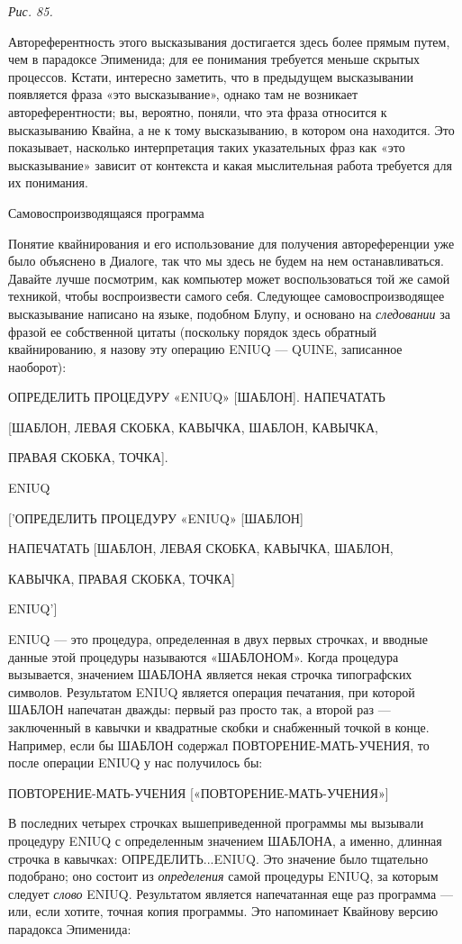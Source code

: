 \emph{Рис. 85.}

Автореферентность этого высказывания достигается здесь более прямым путем, чем в парадоксе Эпименида; для ее понимания требуется меньше скрытых процессов. Кстати, интересно заметить, что в предыдущем высказывании появляется фраза «это высказывание», однако там не возникает автореферентности; вы, вероятно, поняли, что эта фраза относится к высказыванию Квайна, а не к тому высказыванию, в котором она находится. Это показывает, насколько интерпретация таких указательных фраз как «это высказывание» зависит от контекста и какая мыслительная работа требуется для их понимания.

Самовоспроизводящаяся программа

Понятие квайнирования и его использование для получения автореференции уже было объяснено в Диалоге, так что мы здесь не будем на нем останавливаться. Давайте лучше посмотрим, как компьютер может воспользоваться той же самой техникой, чтобы воспроизвести самого себя. Следующее самовоспроизводящее высказывание написано на языке, подобном Блупу, и основано на \emph{следовании} за фразой ее собственной цитаты (поскольку порядок здесь обратный квайнированию, я назову эту операцию ENIUQ --- QUINE, записанное наоборот):

ОПРЕДЕЛИТЬ ПРОЦЕДУРУ «ENIUQ» {[}ШАБЛОН{]}. НАПЕЧАТАТЬ

{[}ШАБЛОН, ЛЕВАЯ СКОБКА, КАВЫЧКА, ШАБЛОН, КАВЫЧКА,

ПРАВАЯ СКОБКА, ТОЧКА{]}.

ENIUQ

{[}'ОПРЕДЕЛИТЬ ПРОЦЕДУРУ «ENIUQ» {[}ШАБЛОН{]}

НАПЕЧАТАТЬ {[}ШАБЛОН, ЛЕВАЯ СКОБКА, КАВЫЧКА, ШАБЛОН,

КАВЫЧКА, ПРАВАЯ СКОБКА, ТОЧКА{]}

ENIUQ'{]}

ENIUQ --- это процедура, определенная в двух первых строчках, и вводные данные этой процедуры называются «ШАБЛОНОМ». Когда процедура вызывается, значением ШАБЛОНА является некая строчка типографских символов. Результатом ENIUQ является операция печатания, при которой ШАБЛОН напечатан дважды: первый раз просто так, а второй раз --- заключенный в кавычки и квадратные скобки и снабженный точкой в конце. Например, если бы ШАБЛОН содержал ПОВТОРЕНИЕ-МАТЬ-УЧЕНИЯ, то после операции ENIUQ у нас получилось бы:

ПОВТОРЕНИЕ-МАТЬ-УЧЕНИЯ {[}«ПОВТОРЕНИЕ-МАТЬ-УЧЕНИЯ»{]}

В последних четырех строчках вышеприведенной программы мы вызывали процедуру ENIUQ с определенным значением ШАБЛОНА, а именно, длинная строчка в кавычках: ОПРЕДЕЛИТЬ...ENIUQ. Это значение было тщательно подобрано; оно состоит из \emph{определения} самой процедуры ENIUQ, за которым следует \emph{слово} ENIUQ. Результатом является напечатанная еще раз программа --- или, если хотите, точная копия программы. Это напоминает Квайнову версию парадокса Эпименида:

